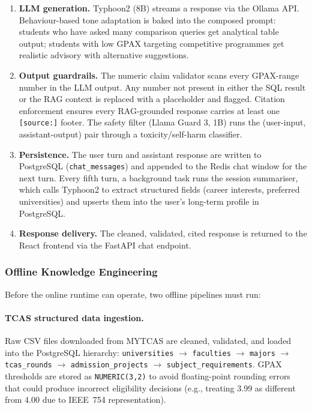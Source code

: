 ﻿\documentclass[12pt,a4paper]{article}
\begin{document}
\begin{enumerate}
    \item \textbf{LLM generation.} Typhoon2 (8B) streams a response via the Ollama
    API. Behaviour-based tone adaptation is baked into the composed prompt: students
    who have asked many comparison queries get analytical table output; students with
    low GPAX targeting competitive programmes get realistic advisory with alternative
    suggestions.

    \item \textbf{Output guardrails.} The numeric claim validator scans every
    GPAX-range number in the LLM output. Any number not present in either the SQL
    result or the RAG context is replaced with a placeholder and flagged. Citation
    enforcement ensures every RAG-grounded response carries at least one
    \texttt{[source:]} footer. The safety filter (Llama Guard 3, 1B) runs the
    (user-input, assistant-output) pair through a toxicity/self-harm classifier.

    \item \textbf{Persistence.} The user turn and assistant response are written to
    PostgreSQL (\texttt{chat\_messages}) and appended to the Redis chat window for
    the next turn. Every fifth turn, a background task runs the session summariser,
    which calls Typhoon2 to extract structured fields (career interests, preferred
    universities) and upserts them into the user's long-term profile in PostgreSQL.

    \item \textbf{Response delivery.} The cleaned, validated, cited response is
    returned to the React frontend via the FastAPI chat endpoint.
\end{enumerate}

\subsubsection{Offline Knowledge Engineering}

Before the online runtime can operate, two offline pipelines must run:

\paragraph{TCAS structured data ingestion.} Raw CSV files downloaded from MYTCAS
are cleaned, validated, and loaded into the PostgreSQL hierarchy:
\texttt{universities} $\to$ \texttt{faculties} $\to$ \texttt{majors} $\to$
\texttt{tcas\_rounds} $\to$ \texttt{admission\_projects} $\to$ \texttt{subject\_requirements}.
GPAX thresholds are stored as \texttt{NUMERIC(3,2)} to avoid floating-point rounding
errors that could produce incorrect eligibility decisions (e.g., treating 3.99 as
different from 4.00 due to IEEE~754 representation).
\end{document}
